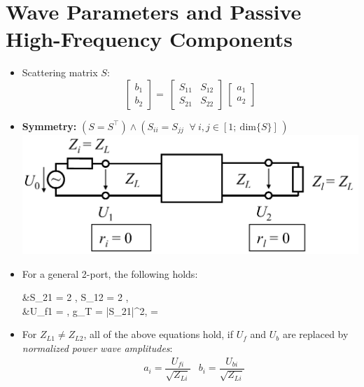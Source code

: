 \section{Wave Parameters and Passive High-Frequency Components}
\begin{itemize}
    \itemsep0pt
    \item Scattering matrix $S$:
        \[\begin{bmatrix}b_1\\ b_2\end{bmatrix} =\
            \begin{bmatrix}S_{11} & S_{12}\\ S_{21} & S_{22}\end{bmatrix} \
            \begin{bmatrix}a_1\\ a_2\end{bmatrix}\]
            \item \textbf{Symmetry:} \(\left(S = S^\top\right) \land \left(S_{ii} = S_{jj}\;\;\forall\:i, j \in \left[1;\:\mathrm{dim}\{S\}\right]\,\right)\)
                \includegraphics[width=.3\paperheight]{content/hfcomp/pictures/general_two-port.png}
    \item For a general 2-port, the following holds:
        \begin{flalign*}
            &S_{21} = 2 \dfrac{U_2}{U_0} ,\;\; S_{12} = 2  ,\\
            &U_{f1} = ,\;\; g_T = |S_{21}|^2,\;\;  = 
        \end{flalign*}
    \item For \(Z_{L1} \neq Z_{L2}\), all of the above equations hold, if $U_f$ and $U_b$ are replaced by \textit{normalized power wave amplitudes}:
        \begin{align*}
            &a_i = \dfrac{U_{fi}}{\sqrt{Z_{Li}}} &b_i = \dfrac{U_{bi}}{\sqrt{Z_{Li}}}
        \end{align*}
\end{itemize}

